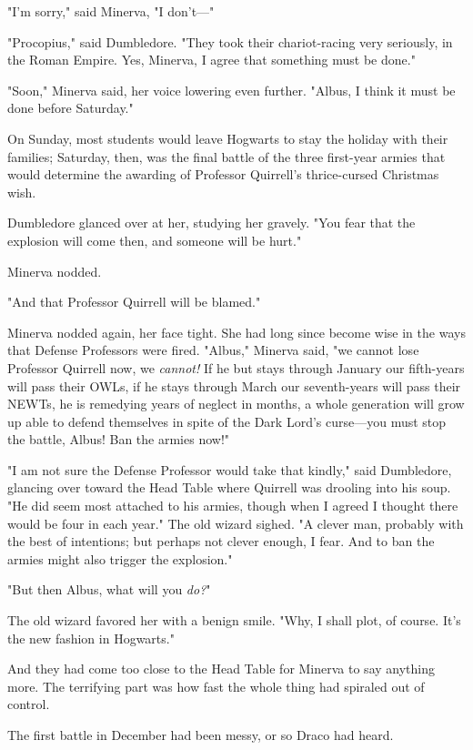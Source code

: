 "I'm sorry," said Minerva, "I don't---"

"Procopius," said Dumbledore. "They took their chariot-racing very seriously,
in the Roman Empire. Yes, Minerva, I agree that something must be done."

"Soon," Minerva said, her voice lowering even further. "Albus, I think it must
be done before Saturday."

On Sunday, most students would leave Hogwarts to stay the holiday with their
families; Saturday, then, was the final battle of the three first-year armies
that would determine the awarding of Professor Quirrell's thrice-cursed
Christmas wish.

Dumbledore glanced over at her, studying her gravely. "You fear that the
explosion will come then, and someone will be hurt."

Minerva nodded.

"And that Professor Quirrell will be blamed."

Minerva nodded again, her face tight. She had long since become wise in the
ways that Defense Professors were fired. "Albus," Minerva said, "we cannot lose
Professor Quirrell now, we \emph{cannot!} If he but stays through January our
fifth-years will pass their OWLs, if he stays through March our seventh-years
will pass their NEWTs, he is remedying years of neglect in months, a whole
generation will grow up able to defend themselves in spite of the Dark Lord's
curse---you must stop the battle, Albus! Ban the armies now!"

"I am not sure the Defense Professor would take that kindly," said Dumbledore,
glancing over toward the Head Table where Quirrell was drooling into his soup.
"He did seem most attached to his armies, though when I agreed I thought there
would be four in each year." The old wizard sighed. "A clever man, probably
with the best of intentions; but perhaps not clever enough, I fear. And to ban
the armies might also trigger the explosion."

"But then Albus, what will you \emph{do?}"

The old wizard favored her with a benign smile. "Why, I shall plot, of course.
It's the new fashion in Hogwarts."

And they had come too close to the Head Table for Minerva to say anything more.
\sbreak
The terrifying part was how fast the whole thing had spiraled out of control.

The first battle in December had been{\el} messy, or so Draco had heard.

